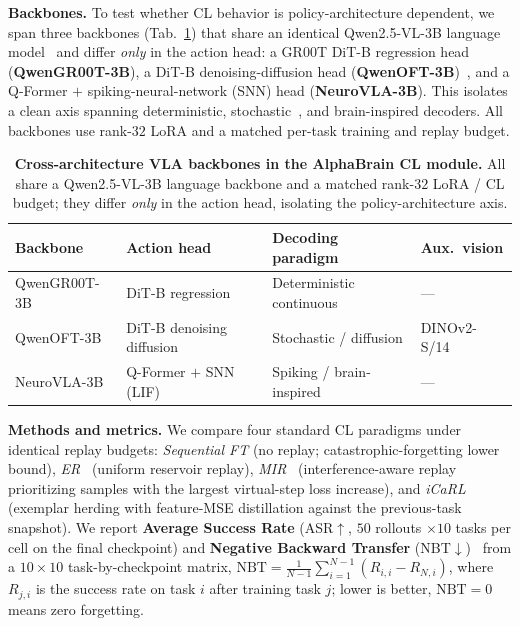 \textbf{Backbones.} To test whether CL behavior is policy-architecture dependent, we span three backbones (Tab.~\ref{tab:backbones}) that share an identical Qwen2.5-VL-3B language model~\citep{community2026starvla} and differ \emph{only} in the action head: a GR00T DiT-B regression head (\textbf{QwenGR00T-3B}), a DiT-B denoising-diffusion head (\textbf{QwenOFT-3B})~\citep{chi2025diffusion}, and a Q-Former $+$ spiking-neural-network (SNN) head (\textbf{NeuroVLA-3B}). This isolates a clean axis spanning deterministic, stochastic~\citep{zhang2025flowpolicy}, and brain-inspired decoders. All backbones use rank-$32$ LoRA and a matched per-task training and replay budget.

\begin{table}[t]
    \centering
    \caption{\small{\textbf{Cross-architecture VLA backbones in the AlphaBrain CL module.} All share a Qwen2.5-VL-3B language backbone and a matched rank-$32$ LoRA / CL budget; they differ \emph{only} in the action head, isolating the policy-architecture axis.}}
    \label{tab:backbones}
    \vspace{0.2em}
    \footnotesize
    \setlength{\tabcolsep}{6pt}
    \renewcommand{\arraystretch}{1.15}
    \begin{tabular}{l l l l}
        \toprule
        \textbf{Backbone} & \textbf{Action head} & \textbf{Decoding paradigm} & \textbf{Aux.\ vision} \\
        \midrule
        QwenGR00T-3B & DiT-B regression          & Deterministic continuous & ---         \\
        QwenOFT-3B   & DiT-B denoising diffusion & Stochastic / diffusion   & DINOv2-S/14 \\
        NeuroVLA-3B  & Q-Former $+$ SNN (LIF)    & Spiking / brain-inspired & ---         \\
        \bottomrule
    \end{tabular}
\end{table}

\textbf{Methods and metrics.} We compare four standard CL paradigms under identical replay budgets: \emph{Sequential FT} (no replay; catastrophic-forgetting lower bound), \emph{ER}~\citep{rolnick2019experience} (uniform reservoir replay), \emph{MIR}~\citep{aljundi2019online} (interference-aware replay prioritizing samples with the largest virtual-step loss increase), and \emph{iCaRL}~\citep{rebuffi2017icarl} (exemplar herding with feature-MSE distillation against the previous-task snapshot). We report \textbf{Average Success Rate} (ASR$\uparrow$, $50$ rollouts $\times 10$ tasks per cell on the final checkpoint) and \textbf{Negative Backward Transfer} (NBT$\downarrow$)~\citep{lopez2017gradient} from a $10{\times}10$ task-by-checkpoint matrix, $\mathrm{NBT}=\frac{1}{N-1}\sum_{i=1}^{N-1}(R_{i,i}-R_{N,i})$, where $R_{j,i}$ is the success rate on task $i$ after training task $j$; lower is better, $\mathrm{NBT}{=}0$ means zero forgetting.

